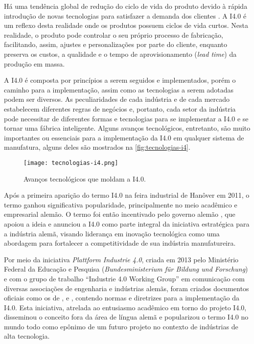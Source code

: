 Há uma tendência global de redução do ciclo de vida do produto devido à rápida introdução de novas tecnologias para satisfazer a demanda dos clientes \cite{trappey2008lifecycle}. A I4.0 é um reflexo desta realidade onde os produtos possuem ciclos de vida curtos. Nesta realidade, o produto pode controlar o seu próprio processo de fabricação, facilitando, assim, ajustes e personalizações por parte do cliente, enquanto preserva os custos, a qualidade e o tempo de aprovisionamento (\textit{lead time}) da produção em massa.

A I4.0 é composta por princípios a serem seguidos e implementados, porém o caminho para a implementação, assim como as tecnologias a serem adotadas podem ser diversos. As peculiaridades de cada indústria e de cada mercado estabelecem diferentes regras de negócios e, portanto, cada setor da indústria pode necessitar de diferentes formas e tecnologias para se implementar a I4.0 e se tornar uma fábrica inteligente. Alguns avanços tecnológicos, entretanto, são muito importantes ou essenciais para a implementação da I4.0 em qualquer sistema de manufatura, alguns deles são mostrados na \autoref{fig:tecnologias-i4}.

\begin{figure}[htb]
	\centering
	\texttt{[image: tecnologias-i4.png]}
	\caption{Avanços tecnológicos que moldam a I4.0.}
	\label{fig:tecnologias-i4}
\end{figure}

Após a primeira aparição do termo I4.0 na feira industrial de Hanôver em 2011, o termo ganhou significativa popularidade, principalmente no meio acadêmico e empresarial alemão. O termo foi então incentivado pelo governo alemão \cite{lasi2014industryfour, kagermann2013recommendations}, que apoiou a ideia e anunciou a I4.0 como parte integral da iniciativa estratégica para a indústria alemã, visando liderança em inovação tecnológica \cite{drath2014industrie} como uma abordagem para fortalecer a competitividade de sua indústria manufatureira.

Por meio da iniciativa \textit{Plattform Industrie 4.0}, criada em 2013 pelo Ministério Federal da Educação e Pesquisa (\textit{Bundesministerium für Bildung und Forschung}) \cite{hartmut2019plattform} e com o grupo de trabalho ``Industrie 4.0 Working Group'' em comunicação com diversas associações de engenharia e indústrias alemãs, foram criados documentos oficiais como os de ,  e , contendo normas e diretrizes para a implementação da I4.0. Esta iniciativa, atrelada ao entusiasmo acadêmico em torno do projeto I4.0, disseminou o conceito fora da área de língua alemã e popularizou o termo I4.0 no mundo todo como epônimo de um futuro projeto no contexto de indústrias de alta tecnologia.

